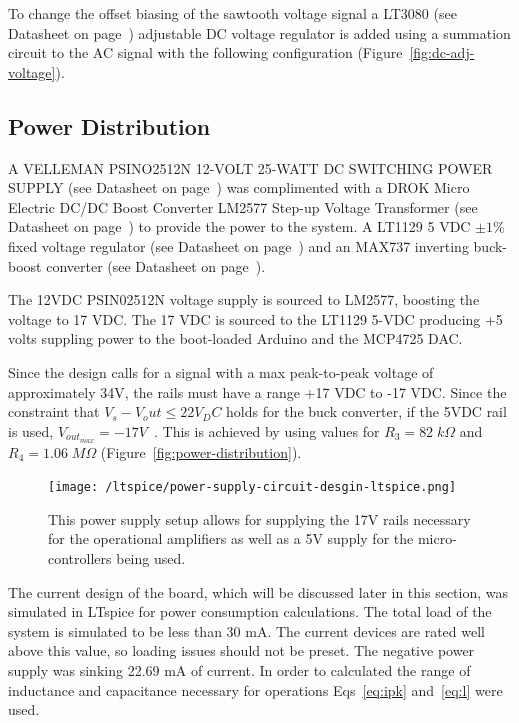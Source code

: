 \documentclass[12pt,journal]{IEEEtran}
\begin{document}
To change the offset biasing of the sawtooth voltage signal a LT3080 (see Datasheet on page~\pageref{datasheet:lt3080}) adjustable DC voltage regulator is added using a summation circuit to the AC signal with the following configuration (Figure~\ref{fig:dc-adj-voltage}).


\subsection{Power Distribution}

A VELLEMAN PSINO2512N 12-VOLT 25-WATT DC SWITCHING POWER SUPPLY (see Datasheet on page~\pageref{datasheet:psino2512n}) was complimented with a DROK Micro Electric DC/DC Boost Converter LM2577 Step-up Voltage Transformer (see Datasheet on page~\pageref{datasheet:lm2577}) to provide the power to the system. A LT1129 5 VDC $\pm 1\%$ fixed voltage regulator (see Datasheet on page~\pageref{datasheet:lt1129}) and an MAX737 inverting buck-boost converter (see Datasheet on page~\pageref{datasheet:max635}). 

The 12VDC PSIN02512N voltage supply is sourced to LM2577, boosting the voltage to 17 VDC. The 17 VDC is sourced to the LT1129 5-VDC producing +5 volts suppling power to the boot-loaded Arduino and the MCP4725 DAC. 

Since the design calls for a signal with a max peak-to-peak voltage of approximately 34V, the rails must have a range +17 VDC to -17 VDC. Since the constraint that $V_s - V_out \leq 22 V_DC$ holds for the buck converter, if the 5VDC rail is used, $V_{out_{max}} = -17 V$~\cite{datasheet_max635}. This is achieved by using values for $R_3 = 82\;k\Omega$ and $R_4 = 1.06\;M\Omega$ (Figure~\ref{fig:power-distribution}). 

\begin{figure}[tb]
  \centering
	\texttt{[image: /ltspice/power-supply-circuit-desgin-ltspice.png]}
	\caption{This power supply setup allows for supplying the 17V rails necessary for the operational amplifiers as well as a 5V supply for the micro-controllers being used.}
	\label{fig:amplifier-configuration}
\end{figure}

The current design of the board, which will be discussed later in this section, was simulated in LTspice for power consumption calculations. The total load of the system is simulated to be less than 30 mA. The current devices are rated well above this value, so loading issues should not be preset. The negative power supply was sinking 22.69 mA of current. In order to calculated the range of inductance and capacitance necessary for operations Eqs~\ref{eq:ipk} and~\ref{eq:l} were used. 
\end{document}
